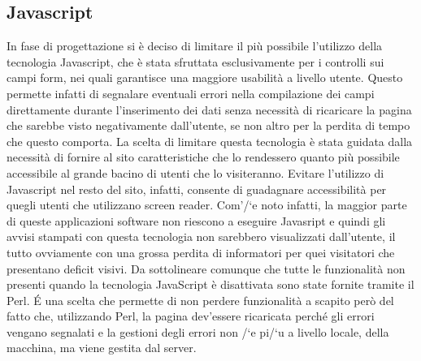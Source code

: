 \subsection{Javascript}
In fase di progettazione si \`e deciso di limitare il pi\`u possibile l'utilizzo della tecnologia Javascript, che \`e stata sfruttata esclusivamente per i controlli sui campi form, nei quali garantisce una maggiore usabilit\`a a livello utente. Questo permette infatti di segnalare eventuali errori nella compilazione dei campi direttamente durante l'inserimento dei dati senza necessit\`a di ricaricare la pagina che sarebbe visto negativamente dall'utente, se non altro per la perdita di tempo che questo comporta. La scelta di limitare questa tecnologia \`e stata guidata dalla necessit\`a di fornire al sito caratteristiche che lo rendessero quanto pi\`u possibile accessibile al grande bacino di utenti che lo visiteranno. Evitare l'utilizzo di Javascript nel resto del sito, infatti, consente di guadagnare accessibilit\`a per quegli utenti che utilizzano screen reader. Com'/`e noto infatti, la maggior parte di queste applicazioni software non riescono a eseguire Javasript e quindi gli avvisi stampati con questa tecnologia non sarebbero visualizzati dall'utente, il tutto ovviamente con una grossa perdita di informatori per quei visitatori che presentano deficit visivi.
Da sottolineare comunque che tutte le funzionalit\`a non presenti quando la tecnologia JavaScript \`e disattivata sono state fornite tramite il Perl. \'E una scelta che permette di non perdere funzionalit\`a a scapito per\`o del fatto che, utilizzando Perl, la pagina dev'essere ricaricata perch\'e gli errori vengano segnalati e la gestioni degli errori non /`e pi/`u a livello locale, della macchina, ma viene gestita dal server.

